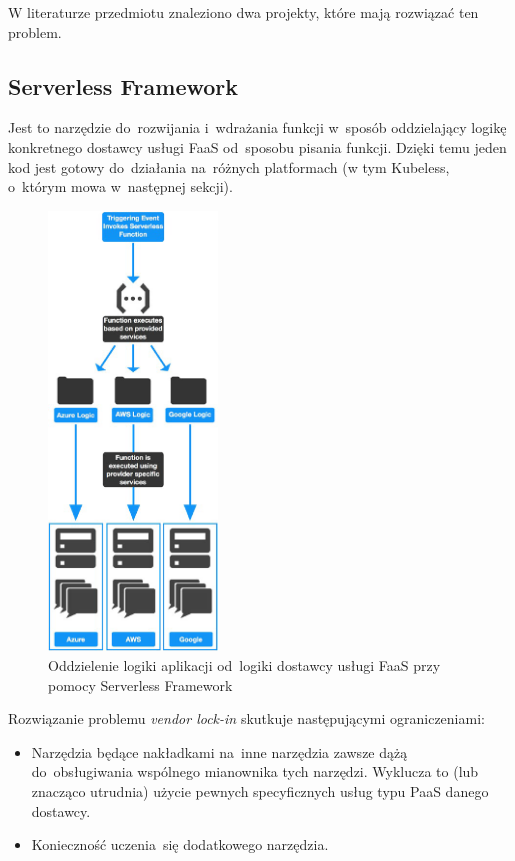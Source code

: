 \documentclass[12pt,a4paper,twoside,titlepage,openright]{book}
\begin{document}
W literaturze przedmiotu znaleziono dwa projekty, które mają rozwiązać ten problem.

\subsection{Serverless Framework}

Jest to narzędzie do~rozwijania i~wdrażania funkcji w~sposób oddzielający logikę konkretnego dostawcy usługi FaaS od~sposobu pisania funkcji. Dzięki temu jeden kod jest gotowy do~działania na~różnych platformach (w tym Kubeless, o~którym mowa w~następnej sekcji). \cite{serverlessMaddie}

\begin{figure}[h]
	\centering
			\includegraphics[width=0.4\textwidth]{serverless-framework.png}
		\caption{Oddzielenie logiki aplikacji od~logiki dostawcy usługi FaaS przy pomocy Serverless Framework \cite{serverlessMaddie}}
		\label{fig:serverless-framework}
\end{figure}

Rozwiązanie problemu \textit{vendor lock-in} skutkuje następującymi ograniczeniami:
\begin{itemize}
\item Narzędzia będące nakładkami na~inne narzędzia zawsze dążą do~obsługiwania wspólnego mianownika tych narzędzi. Wyklucza to (lub znacząco utrudnia) użycie pewnych specyficznych usług typu PaaS danego dostawcy.
\item Konieczność uczenia~się dodatkowego narzędzia.
\end{itemize}
\end{document}
